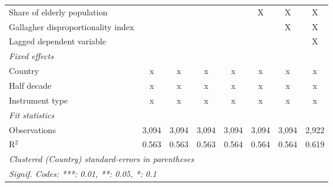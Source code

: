 \begin{tabular}{lccccccc}
   Share of elderly population                                              &               &               &               &               & X             & X             & X\\  
   Gallagher disproportionality index                                       &               &               &               &               &               & X             & X\\  
   Lagged dependent variable                                                &               &               &               &               &               &               & X\\  
   \emph{Fixed effects}\\
   Country                                                                  & x             & x             & x             & x             & x             & x             & x\\  
   Half decade                                                              & x             & x             & x             & x             & x             & x             & x\\  
   Instrument type                                                          & x             & x             & x             & x             & x             & x             & x\\  
   \midrule \emph{Fit statistics}\\
   Observations                                                             & 3,094         & 3,094         & 3,094         & 3,094         & 3,094         & 3,094         & 2,922\\  
   R$^2$                                                                    & 0.563         & 0.563         & 0.563         & 0.564         & 0.564         & 0.564         & 0.619\\  
   \midrule
   \multicolumn{8}{l}{\emph{Clustered (Country) standard-errors in parentheses}}\\
   \multicolumn{8}{l}{\emph{Signif. Codes: ***: 0.01, **: 0.05, *: 0.1}}\\
\end{tabular}
\par\endgroup


